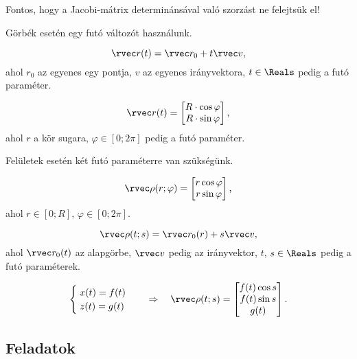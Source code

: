 \documentclass[a4paper, 12pt, fleqn]{scrartcl}
\begin{document}
\begin{note}
  Fontos, hogy a Jacobi-mátrix determinánsával való szorzást ne felejtsük el!
\end{note}

\begin{blueBox}

  Görbék esetén egy futó változót használunk.

  $$
    \rvec r(t) = \rvec r_0 + t \rvec v
    \text,
  $$
  ahol $r_0$ az egyenes egy pontja, $v$ az egyenes irányvektora, $t \in \Reals$
  pedig a futó paraméter.

  $$
    \rvec r(t) = \begin{bmatrix}
      R \cdot \cos \varphi \\
      R \cdot \sin \varphi
    \end{bmatrix}
    \text,
  $$
  ahol $r$ a kör sugara, $\varphi \in [0; 2\pi]$ pedig a futó paraméter.
\end{blueBox}

\begin{blueBox}

  Felületek esetén két futó paraméterre van szükségünk.

  $$
    \rvec \rho (r; \varphi) = \begin{bmatrix}
      r \cos \varphi \\
      r \sin \varphi
    \end{bmatrix}
    \text,
  $$
  ahol $r \in [0; R]$, $\varphi \in [0; 2\pi]$.

  $$
    \rvec \rho(t; s) = \rvec r_0(r) + s \rvec v
    \text,
  $$
  ahol $\rvec r_0(t)$ az alapgörbe, $\rvec v$ pedig az irányvektor, $t$,
  $s \in \Reals$ pedig a futó paraméterek.

  $$
    \begin{cases}
      \; x(t) = f(t) \\
      \; z(t) = g(t)
    \end{cases}
    \quad \Rightarrow \quad
    \rvec \rho(t;s) = \begin{bmatrix}
      f(t) \cos s \\
      f(t) \sin s \\
      g(t)
    \end{bmatrix}
    \text.
  $$
\end{blueBox}

\clearpage
\subsection{Feladatok}
\end{document}
